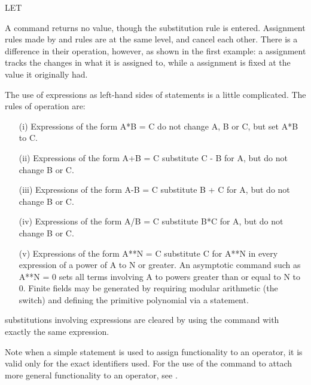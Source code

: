 \begin{Command}{LET}

\begin{Comments}
A  command returns no value, though the substitution rule is
entered.  Assignment rules made by  and  
rules are at the
same level, and cancel each other.  There is a difference in their
operation, however, as shown in the first example:  a  assignment
tracks the changes in what it is assigned to, while a \name{:=} assignment
is fixed at the value it originally had.  

The use of expressions as left-hand sides of  statements is a 
little complicated.  The rules of operation are:
\begin{itemize}

\item[(i)]
Expressions of the form A*B = C do not change A, B or C, but set A*B to C.

\item[(ii)]
Expressions of the form A+B = C substitute C - B for A, but do not change
B or C.

\item[(iii)]
Expressions of the form A-B = C substitute B + C for A, but do not change
B or C.

\item[(iv)]
Expressions of the form A/B = C substitute B*C for A, but do not change B or
C.

\item[(v)]
Expressions of the form A**N = C substitute C for A**N in every expression of
a power of A to N or greater.  An asymptotic command such as A**N = 0 sets
all terms involving A to powers greater than or equal to N to 0.  Finite
fields may be generated by requiring modular arithmetic (the 
switch) and defining the primitive polynomial via a  statement.

\end{itemize}
 substitutions involving expressions are cleared by using
the  command with exactly the same expression.

Note when a simple  statement is used to assign functionality to an
operator, it is valid only for the exact identifiers used.  For the use of the 
 command to attach more general functionality to an operator,
see .


\end{Comments}
\end{Command}
